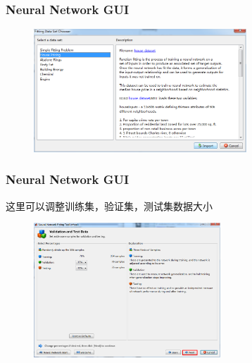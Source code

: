\documentclass[slidestop,compress,mathserif,c]{beamer}
\begin{document}
\begin{frame}
\frametitle{Neural Network GUI}

\begin{figure}
\centering
\includegraphics[width=8cm]{4}
\end{figure}


\end{frame}


\begin{frame}
\frametitle{Neural Network GUI}
这里可以调整训练集，验证集，测试集数据大小
\begin{figure}
\centering
\includegraphics[width=7cm]{5}
\end{figure}


\end{frame}
\end{document}
